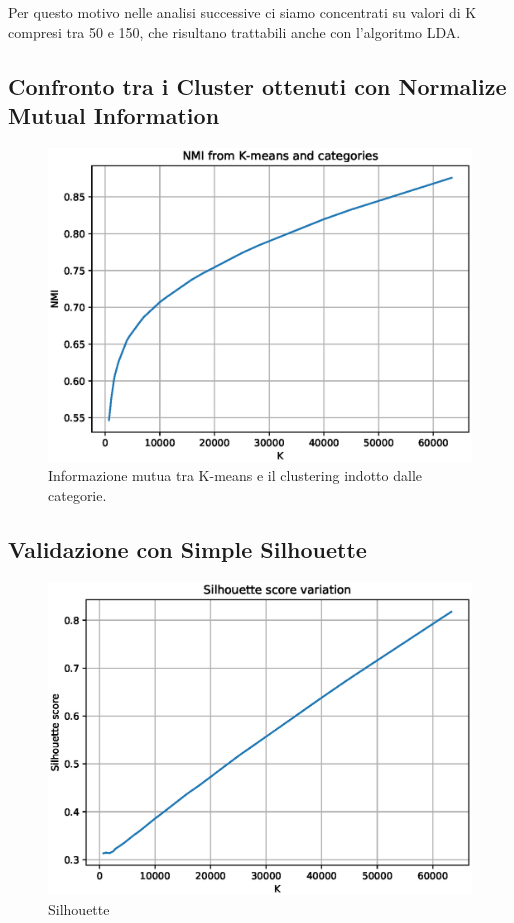 \documentclass[
	12pt, %
	a4paper, %
	oneside, %
	headinclude,footinclude, %
	BCOR5mm, %
]{scrartcl}
\begin{document}
	Per questo motivo nelle analisi successive ci siamo concentrati su valori di K compresi tra 50 e 150, che risultano trattabili anche con l'algoritmo LDA.

	\subsection{Confronto tra i Cluster ottenuti con Normalize Mutual Information}
		\begin{figure}[!htb]
			\centering
			\includegraphics[scale=.5]{../results/NMI-kmeans-categories.eps}
			\caption{Informazione mutua tra K-means e il clustering indotto dalle categorie.}
			\label{fig:NMI-kmeans-categories}
		\end{figure}

	\subsection{Validazione con Simple Silhouette}
		\begin{figure}[!htb]
			\centering
			\includegraphics[scale=.5]{../results/silhouette.eps}
			\caption{Silhouette}
			\label{fig:silhouette}
		\end{figure}
\end{document}
